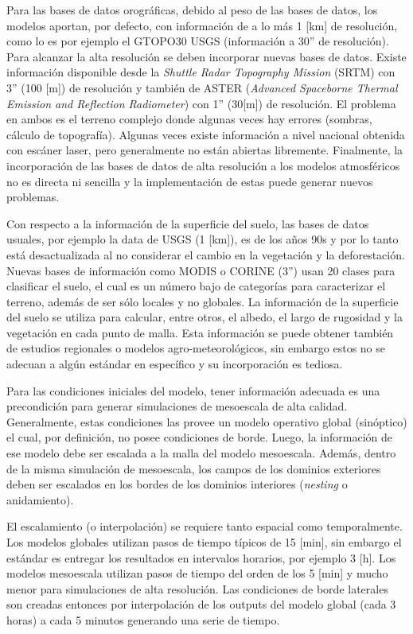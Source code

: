 Para las bases de datos orográficas, debido al peso de las bases de datos, los modelos aportan, por defecto, con información de a lo más 1 [km] de resolución, como lo es por ejemplo el GTOPO30 USGS (información a 30'' de resolución). Para alcanzar la alta resolución se deben incorporar nuevas bases de datos. Existe información disponible desde la \emph{Shuttle Radar Topography Mission} (SRTM) con 3'' (100 [m]) de resolución y también de ASTER (\emph{Advanced Spaceborne Thermal Emission and Reflection Radiometer}) con 1'' (30[m]) de resolución. El problema en ambos es el terreno complejo donde algunas veces hay errores (sombras, cálculo de topografía). Algunas veces existe información a nivel nacional obtenida con escáner laser, pero generalmente no están abiertas libremente. Finalmente, la incorporación de las bases de datos de alta resolución a los modelos atmosféricos no es directa ni sencilla y la implementación de estas puede generar nuevos problemas.

Con respecto a la información de la superficie del suelo, las bases de datos usuales, por ejemplo la data de USGS (1 [km]), es de los años 90s y por lo tanto está desactualizada al no considerar el cambio en la vegetación y la deforestación. Nuevas bases de información como MODIS o CORINE (3'') usan 20 clases para clasificar el suelo, el cual es un número bajo de categorías para caracterizar el terreno, además de ser sólo locales y no globales. La información de la superficie del suelo se utiliza para calcular, entre otros, el albedo, el largo de rugosidad y la vegetación en cada punto de malla. Esta información se puede obtener también de estudios regionales o modelos agro-meteorológicos, sin embargo estos no se adecuan a algún estándar en específico y su incorporación es tediosa.
 
Para las condiciones iniciales del modelo, tener información adecuada es una precondición para generar simulaciones de mesoescala de alta calidad. Generalmente, estas condiciones las provee un modelo operativo global (sinóptico) el cual, por definición, no posee condiciones de borde. Luego, la información de ese modelo debe ser escalada a la malla del modelo mesoescala. Además, dentro de la misma simulación de mesoescala, los campos de los dominios exteriores deben ser escalados en los bordes de los dominios interiores (\emph{nesting} o anidamiento). 

El escalamiento (o interpolación) se requiere tanto espacial como temporalmente. Los modelos globales utilizan pasos de tiempo típicos de 15 [min], sin embargo el estándar es entregar los resultados en intervalos horarios, por ejemplo 3 [h]. Los modelos mesoescala utilizan pasos de tiempo del orden de los 5 [min] y mucho menor para simulaciones de alta resolución. Las condiciones de borde laterales son creadas entonces por interpolación de los outputs del modelo global (cada 3 horas) a cada 5 minutos generando una serie de tiempo. 

